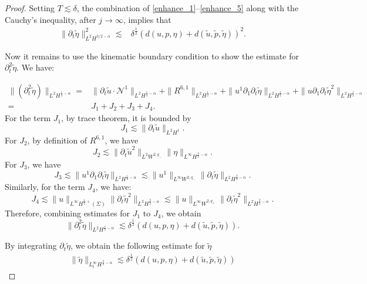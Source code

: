 \documentclass[letterpaper,reqno,10pt,twoside]{amsart}
\theoremstyle{definition}
\theoremstyle{remark}
\def\p{\partial}
\def\no{\nonumber}
\begin{document}
\begin{proof}
			Setting $T\lesssim \delta$, the combination of \eqref{enhance_1}--\eqref{enhance_5} along with the Cauchy's inequality, after $j\to\infty$, implies that
			\begin{equation}\label{est:contract_3}
				\begin{aligned}
					\|\p_t\tilde{\eta}\|_{L^2H^{3/2-\alpha}}^2
					\lesssim& \delta^{\frac{1}{2}}(d(u,p,\eta)+d(\tilde{u},\tilde{p},\tilde{\eta}))^{2}.
				\end{aligned}
			\end{equation}
			
			Now it remains to use the kinematic boundary condition to show the estimate for $\p_{t}^{2}\tilde{\eta}$. We have:
			
			\begin{align}\label{eq:highest_d}
				\|(\p_t^{2}\tilde{\eta})\|_{L^{2}H^{\frac{1}{2}-\alpha}}=&\|\p_t\tilde{u}\cdot\mathcal{N}^1\|_{L^{2}H^{\frac{1}{2}-\alpha}}+\|R^{6,1}\|_{L^{2}H^{\frac{1}{2}-\alpha}}+\|u^{1}\p_{1}\p_{t}\tilde{\eta}\|_{L^{2}H^{\frac{1}{2}-\alpha}}+\|u\p_{1}\p_{t}\tilde{\eta}^{2}\|_{L^{2}H^{\frac{1}{2}-\alpha}}\\
				=&J_1+J_2+J_3+J_4.\no
			\end{align}
			\noindent For the term $J_1$, by trace theorem, it is bounded by
			\[
			J_{1}\lesssim \|\p_{t}\tilde{u}\|_{L^{2}H^{1}}.
			\]
			\noindent For $J_{2}$, by definition of $R^{6,1}$, we have
			\[
			J_2\lesssim \|\p_{t}\tilde{u}^{2}\|_{L^{2}W^{2,q_{-}}}\|\eta\|_{L^{\infty}H^{\frac{3}{2}-\alpha}}.
			\]
			\noindent For $J_3$, we have
			\[
			J_{3}\lesssim \|u^{1}\p_{1}\p_{t}\tilde{\eta}\|_{L^{2}H^{\frac{1}{2}-\alpha}}
			\lesssim\|u^{1}\|_{L^{\infty}W^{2,q_{-}}}\|\p_{t}\tilde{\eta}\|_{L^{2}H^{\frac{3}{2}-\alpha}}.
			\]
			\noindent Similarly, for the term $J_{4}$, we have:
			\[
			J_{4}\lesssim \|u\|_{L^{\infty}H^{\frac{1}{2}+}(\Sigma)}\|\p_{t}\tilde{\eta}^{2}\|_{L^{2}H^{\frac{3}{2}-\alpha}}\lesssim \|u\|_{L^{\infty}W^{2,q_{+}}}\|\p_{t}\tilde{\eta}^{2}\|_{L^{2}H^{\frac{3}{2}-\alpha}}.
			\]
			\noindent Therefore, combining estimates for $J_{1}$ to $J_{4}$, we obtain
			\[
			\|\p_t^{2}\tilde{\eta}\|_{L^{2}H^{\frac{1}{2}-\alpha}}\lesssim \delta^{\frac{1}{2}}(d(u,p,\eta)+d(\tilde{u},\tilde{p},\tilde{\eta})).
			\]
			
			By integrating $\p_{t}\tilde{\eta}$, we obtain the following estimate for $\tilde{\eta}$
			\begin{align}
				\|\tilde{\eta}\|_{L_{t}^{\infty}H^{\frac{3}{2}-\alpha}}\lesssim \delta^{\frac{1}{2}}(d(u,p,\eta)+d(\tilde{u},\tilde{p},\tilde{\eta}))
			\end{align}
			

\end{proof}
\end{document}
